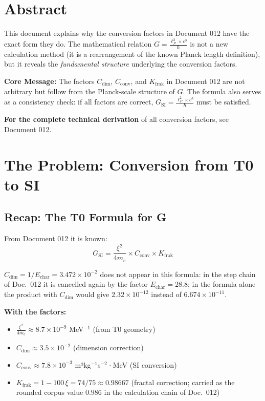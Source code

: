\section*{Abstract}
		This document explains why the conversion factors in Document 012 have the exact form they do. The mathematical relation $G = \frac{\ell_P^2 \times c^3}{\hbar}$ is not a new calculation method (it is a rearrangement of the known Planck length definition), but it reveals the \textit{fundamental structure} underlying the conversion factors.
		
		\textbf{Core Message:} The factors $C_{\text{dim}}$, $C_{\text{conv}}$, and $K_{\text{frak}}$ in Document 012 are not arbitrary but follow from the Planck-scale structure of $G$. The formula also serves as a consistency check: if all factors are correct, $G_{\text{SI}} = \frac{\ell_P^2 \times c^3}{\hbar}$ must be satisfied.
		
		\textbf{For the complete technical derivation} of all conversion factors, see Document 012.

	
	
	\section{The Problem: Conversion from T0 to SI}
	
	\subsection{Recap: The T0 Formula for G}
	
	From Document 012 it is known:
	\begin{equation}
		G_{\text{SI}} = \frac{\xi^2}{4m_e} \times C_{\text{conv}} \times K_{\text{frak}}
	\end{equation}

	$C_{\text{dim}} = 1/E_{\text{char}} = 3.472\times10^{-2}$ does not appear in this formula: in the step chain of Doc.~012 it is cancelled again by the factor $E_{\text{char}} = 28.8$; in the formula alone the product with $C_{\text{dim}}$ would give $2.32\times10^{-12}$ instead of $6.674\times10^{-11}$.
	
	\textbf{With the factors:}
	\begin{itemize}
		\item $\frac{\xi^2}{4m_e} \approx 8.7 \times 10^{-9}$ MeV$^{-1}$ (from T0 geometry)
		\item $C_{\text{dim}} \approx 3.5 \times 10^{-2}$ (dimension correction)
		\item $C_{\text{conv}} \approx 7.8 \times 10^{-3}$ m³kg$^{-1}$s$^{-2}$·MeV (SI conversion)
		\item $K_{\text{frak}} = 1 - 100\,\xi = 74/75 \approx 0.98667$ (fractal correction; carried as the rounded corpus value $0.986$ in the calculation chain of Doc.~012)
	\end{itemize}
	
